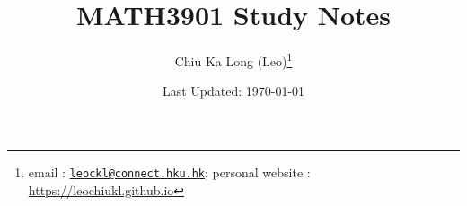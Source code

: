 \documentclass{article}
\begin{document}
\title{MATH3901 Study Notes}
\author{Chiu Ka Long (Leo)\thanks{
email :
\href{mailto:leockl@connect.hku.hk}{\texttt{leockl@connect.hku.hk}};
personal website :
\url{https://leochiukl.github.io}
}}
\date{Last Updated: \today}
\maketitle
\doclicenseThis
\tableofcontents

\printbibliography

\end{document}

